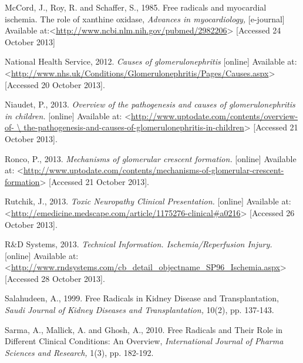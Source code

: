 \documentclass[12pt]{report}
\begin{document}
McCord, J., Roy, R. and Schaffer, S., 1985. Free radicals and myocardial ischemia. The role of xanthine oxidase, \textit{Advances in myocardiology,} [e-journal] Available at:<\url{http://www.ncbi.nlm.nih.gov/pubmed/2982206}> [Accessed 24 October 2013]
\newline
\newline

National Health Service, 2012. \textit{Causes of glomerulonephritis} [online] Available at: <\url{http://www.nhs.uk/Conditions/Glomerulonephritis/Pages/Causes.aspx}> [Accessed 20 October 2013].
\newline
\newline

Niaudet, P., 2013. \textit{Overview of the pathogenesis and causes of glomerulonephritis in children.} [online] Available at: <\url{http://www.uptodate.com/contents/overview-of- \ the-pathogenesis-and-causes-of-glomerulonephritis-in-children}> [Accessed 21 October 2013].
\newline
\newline

Ronco, P., 2013. \textit{Mechanisms of glomerular crescent formation.} [online] Available at: <\url{http://www.uptodate.com/contents/mechanisms-of-glomerular-crescent-formation}> [Accessed 21 October 2013].
\newline
\newline

Rutchik, J., 2013. \textit{Toxic Neuropathy Clinical Presentation.} [online] Available at: <\url{http://emedicine.medscape.com/article/1175276-clinical#a0216}> [Accessed 26 October 2013].
\newline
\newline

R\&D Systems, 2013. \textit{Technical Information. Ischemia/Reperfusion Injury.} [online] Available at: <\url{http://www.rndsystems.com/cb_detail_objectname_SP96_Ischemia.aspx}> [Accessed 28 October 2013].
\newline
\newline

Salahudeen, A., 1999. Free Radicals in Kidney Disease and Transplantation, \textit{Saudi Journal of Kidney Diseases and Transplantation,} 10(2), pp. 137-143.
\newline
\newline

Sarma, A., Mallick, A. and Ghosh, A., 2010. Free Radicals and Their Role in Different Clinical Conditions: An Overview, \textit{International Journal of Pharma Sciences and Research,} 1(3), pp. 182-192.
\newline
\newline
\end{document}
